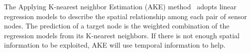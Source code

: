 

The Applying K-nearest neighbor Estimation (AKE) method~\cite{pan2010k}
adopts linear regression models to describe the spatial relationship among
each pair of sensor nodes. The prediction of a target node is the
weighted combination of the regression models from its K-nearest neighbors. If
there is not enough spatial information to be exploited, AKE will use
temporal information to help.

